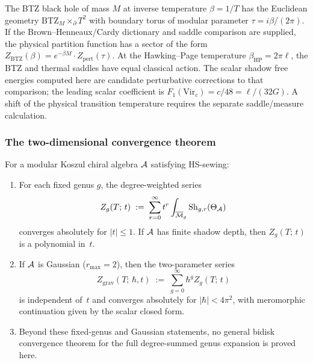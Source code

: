 \begin{example}
The BTZ black hole of mass $M$ at inverse temperature $\beta = 1/T$ has the Euclidean geometry $\mathrm{BTZ}_M \times_\partial T^2$ with boundary torus of modular parameter $\tau = i\beta/(2\pi)$. If the Brown--Henneaux/Cardy dictionary and saddle comparison are supplied, the physical partition function has a sector of the form $Z_{\mathrm{BTZ}}(\beta) = e^{-\beta M} \cdot Z_{\mathrm{pert}}(\tau)$. At the Hawking--Page temperature $\beta_{\mathrm{HP}} = 2\pi \ell$, the BTZ and thermal saddles have equal classical action. The scalar shadow free energies computed here are candidate perturbative corrections to that comparison; the leading scalar coefficient is $F_1(\mathrm{Vir}_c) = c/48 = \ell/(32G)$. A shift of the physical transition temperature requires the separate saddle/measure calculation.
\end{example}

\subsubsection{The two-dimensional convergence theorem}

\begin{theorem}
\label{thm:thqg-I-2d-convergence}
For a modular Koszul chiral algebra $\mathcal{A}$ satisfying HS-sewing:
\begin{enumerate}[label=\textup{(\roman*)}]
\item For each fixed genus $g$, the degree-weighted series
\begin{equation}%
Z_g(T;\,t) \;:=\; \sum_{r=0}^\infty t^r
\int_{\overline{\mathcal{M}}_g} \operatorname{Sh}_{g,r}(\Theta_\cA)
\end{equation}
converges absolutely for $|t| \leq 1$. If $\mathcal{A}$ has finite shadow
depth, then $Z_g(T;\,t)$ is a polynomial in~$t$.
\item If $\mathcal{A}$ is Gaussian \textup{(}$r_{\max}=2$\textup{)}, then the
two-parameter series
\[
Z_{\mathrm{grav}}(T;\,\hbar,t)
\;:=\;
\sum_{g=0}^\infty \hbar^g Z_g(T;\,t)
\]
is independent of~$t$ and converges absolutely for $|\hbar|<4\pi^2$,
with meromorphic continuation given by the scalar closed form.
\item Beyond these fixed-genus and Gaussian statements, no general
bidisk convergence theorem for the full degree-summed genus expansion is
proved here.
\end{enumerate}
\end{theorem}

